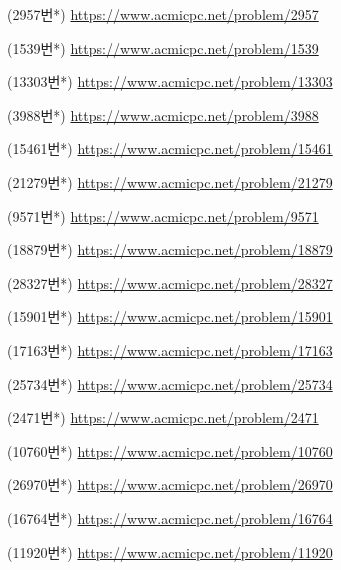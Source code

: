 \begin{problem}
    (2957번*) \url{https://www.acmicpc.net/problem/2957}
\end{problem}
\begin{problem}
    (1539번*) \url{https://www.acmicpc.net/problem/1539}
\end{problem}
\begin{problem}
    (13303번*) \url{https://www.acmicpc.net/problem/13303}
\end{problem}
\begin{problem}
    (3988번*) \url{https://www.acmicpc.net/problem/3988}
\end{problem}
\begin{problem}
    (15461번*) \url{https://www.acmicpc.net/problem/15461}
\end{problem}
\begin{problem}
    (21279번*) \url{https://www.acmicpc.net/problem/21279}
\end{problem}
\begin{problem}
    (9571번*) \url{https://www.acmicpc.net/problem/9571}
\end{problem}
\begin{problem}
    (18879번*) \url{https://www.acmicpc.net/problem/18879}
\end{problem}
\begin{problem}
    (28327번*) \url{https://www.acmicpc.net/problem/28327}
\end{problem}
\begin{problem}
    (15901번*) \url{https://www.acmicpc.net/problem/15901}
\end{problem}
\begin{problem}
    (17163번*) \url{https://www.acmicpc.net/problem/17163}
\end{problem}
\begin{problem}
    (25734번*) \url{https://www.acmicpc.net/problem/25734}
\end{problem}
\begin{problem}
    (2471번*) \url{https://www.acmicpc.net/problem/2471}
\end{problem}
\begin{problem}
    (10760번*) \url{https://www.acmicpc.net/problem/10760}
\end{problem}
\begin{problem}
    (26970번*) \url{https://www.acmicpc.net/problem/26970}
\end{problem}
\begin{problem}
    (16764번*) \url{https://www.acmicpc.net/problem/16764}
\end{problem}
\begin{problem}
    (11920번*) \url{https://www.acmicpc.net/problem/11920}
\end{problem}

